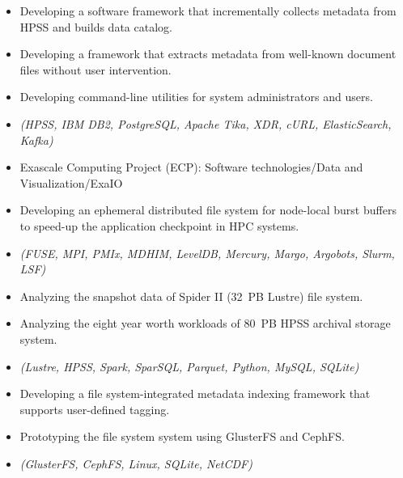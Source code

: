 \begin{itemize}
    \item {Developing a software framework that incrementally collects metadata from HPSS and builds data catalog.}
    \item {Developing a framework that extracts metadata from well-known document files without user intervention.}
    \item {Developing command-line utilities for system administrators and users.}
    \item {\it\small (HPSS, IBM DB2, PostgreSQL, Apache Tika, XDR, cURL, ElasticSearch, Kafka)}
\end{itemize}

\begin{itemize}
    \item {Exascale Computing Project (ECP): Software technologies/Data and Visualization/ExaIO}
    \item {Developing an ephemeral distributed file system for node-local burst buffers
           to speed-up the application checkpoint in HPC systems.}
    \item {\it\small (FUSE, MPI, PMIx, MDHIM, LevelDB, Mercury, Margo, Argobots, Slurm, LSF)}
\end{itemize}

\begin{itemize}
    \item {Analyzing the snapshot data of Spider II (32~PB Lustre) file system.}
    \item {Analyzing the eight year worth workloads of 80~PB HPSS archival storage system.}
    \item {\it\small (Lustre, HPSS, Spark, SparSQL, Parquet, Python, MySQL, SQLite)}
\end{itemize}

\begin{itemize}
    \item {Developing a file system-integrated metadata indexing framework that supports user-defined tagging.}
    \item {Prototyping the file system system using GlusterFS and CephFS.}
    \item {\it\small (GlusterFS, CephFS, Linux, SQLite, NetCDF)}
\end{itemize}

